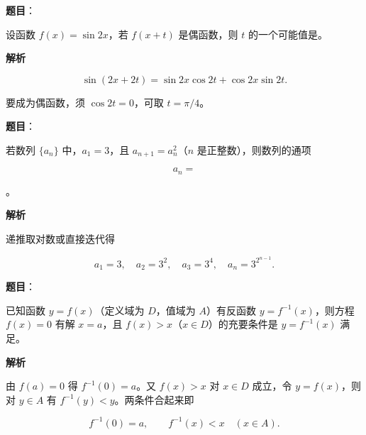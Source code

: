 \begin{answer}

\textbf{题目}：

设函数 $f(x)=\sin2x$，若 $f(x+t)$ 是偶函数，则 $t$ 的一个可能值是\gkblank{}。

\textbf{解析}

\nopagebreak[4]
\[
\sin(2x+2t)=\sin2x\cos2t+\cos2x\sin2t.
\]

要成为偶函数，须 $\cos2t=0$，可取 $t=\pi/4$。


\end{answer}
\begin{answer}

\textbf{题目}：

若数列 $\{a_n\}$ 中，$a_1=3$，且 $a_{n+1}=a_n^2$（$n$ 是正整数），则数列的通项

\nopagebreak[4]
\[
a_n=
\]

\gkblank{}。

\textbf{解析}

递推取对数或直接迭代得

\nopagebreak[4]
\[
a_1=3,\quad a_2=3^2,\quad a_3=3^4,\quad
a_n=3^{2^{n-1}}.
\]


\end{answer}
\begin{answer}

\textbf{题目}：

已知函数 $y=f(x)$（定义域为 $D$，值域为 $A$）有反函数 $y=f^{-1}(x)$，则方程 $f(x)=0$ 有解 $x=a$，且 $f(x)>x$（$x\in D$）的充要条件是 $y=f^{-1}(x)$ 满足\gkblank{}。

\textbf{解析}

由 $f(a)=0$ 得 $f^{-1}(0)=a$。又 $f(x)>x$ 对 $x\in D$ 成立，令 $y=f(x)$，则对 $y\in A$ 有 $f^{-1}(y)<y$。两条件合起来即

\nopagebreak[4]
\[
f^{-1}(0)=a,\qquad f^{-1}(x)<x\quad(x\in A).
\]


\end{answer}

